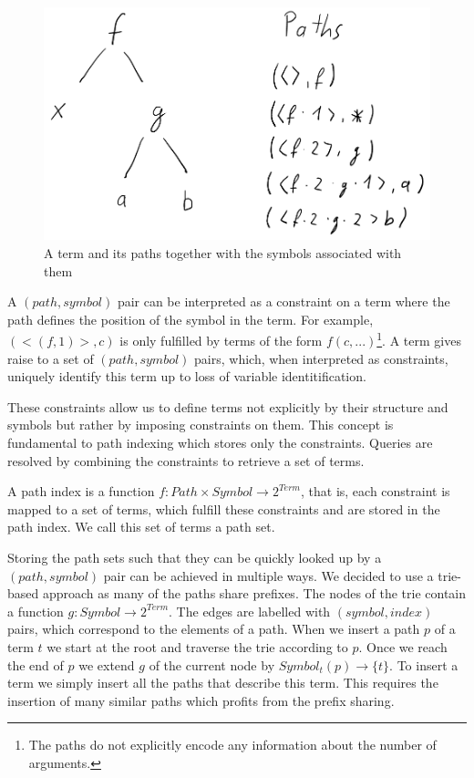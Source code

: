 \begin{figure}[h]
\centering
\includegraphics[scale=0.25]{figures/term_path.png}
\caption{A term and its paths together with the symbols associated with them}
\label{termpaths}
\end{figure}

A $(path, symbol)$ pair can be interpreted as a constraint on a term where the path defines the position of the symbol in the term. For example, $(<(f,1)>, c)$ is only fulfilled by terms of the form $f(c,...)$\footnote{The paths do not explicitly encode any information about the number of arguments.}. A term gives raise to a set of $(path, symbol)$ pairs, which, when interpreted as constraints, uniquely identify this term up to loss of variable identitification.

These constraints allow us to define terms not explicitly by their structure and symbols but rather by imposing constraints on them. This concept is fundamental to path indexing which stores only the constraints. Queries are resolved by combining the constraints to retrieve a set of terms.

\begin{defn}
  A path index is a function $f: Path \times Symbol \longrightarrow 2^{Term}$, that is, each constraint is mapped to a set of terms, which fulfill these constraints and are stored in the path index. We call this set of terms a path set.
\end{defn}

Storing the path sets such that they can be quickly looked up by a $(path, symbol)$ pair can be achieved in multiple ways. We decided to use a trie-based approach as many of the paths share prefixes. The nodes of the trie contain a function $g: Symbol  \longrightarrow 2^{Term}$. The edges are labelled with $(symbol, index)$ pairs, which correspond to the elements of a path. When we insert a path $p$ of a term $t$ we start at the root and traverse the trie according to $p$. Once we reach the end of $p$ we extend $g$ of the current node by $Symbol_{t}(p) \longrightarrow \{t\}$. To insert a term we simply insert all the paths that describe this term. This requires the insertion of many similar paths which profits from the prefix sharing.

